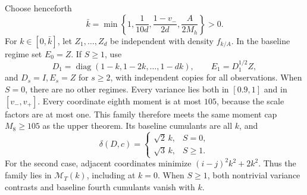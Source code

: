 \documentclass[11pt,a4paper]{article}
\numberwithin{equation}{section}
\newcommand{\cM}{\mathcal M}
\DeclareMathOperator{\diag}{diag}
\begin{document}
Choose henceforth
\begin{equation}\label{eq:kbar}
 \bar k=\min\left\{1,\frac1{10d},\frac{1-v_-}{2d},
                              \frac A{2M_h}\right\}>0.
\end{equation}
For \(k\in[0,\bar k]\), let \(Z_1,\ldots,Z_d\) be independent with
density \(f_{k/A}\). In the baseline regime set \(E_0=Z\).
If \(S\ge1\), use
\[
 D_1=\diag(1-k,1-2k,\ldots,1-dk),\qquad E_1=D_1^{1/2}Z,
\]
and \(D_s=I,E_s=Z\) for \(s\ge2\), with independent copies for all
observations. When \(S=0\), there are no other regimes.
Every variance lies both in \([0.9,1]\) and in \([v_-,v_+]\).
Every coordinate eighth moment is at most \(105\), because the scale
factors are at most one. This family therefore meets the same moment
cap \(M_8\ge105\) as the upper theorem.
Its baseline cumulants are all \(k\), and
\[
 \delta(D,c)=
 \begin{cases}
  \sqrt2\,k,&S=0,\\
  \sqrt3\,k,&S\ge1.
 \end{cases}
\]
For the second case, adjacent coordinates minimize
\((i-j)^2k^2+2k^2\).
Thus the family lies in \(\cM_T(k)\), including at \(k=0\).
When \(S\ge1\), both nontrivial variance contrasts and baseline fourth
cumulants vanish with \(k\).
\end{document}
